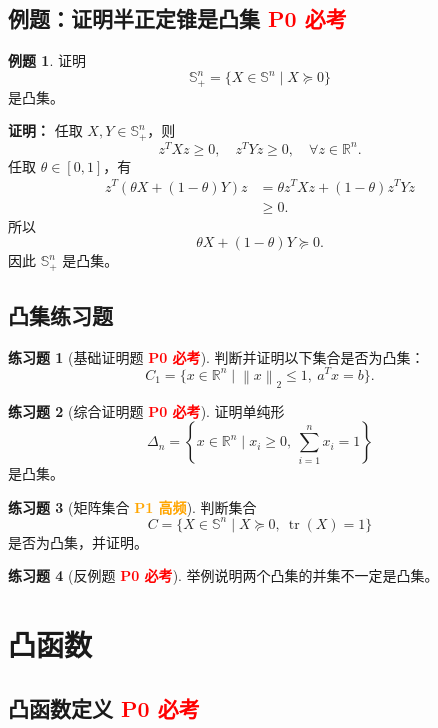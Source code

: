 \documentclass[11pt,a4paper]{ctexart}
\newcommand{\R}{\mathbb{R}}
\newcommand{\Ssym}{\mathbb{S}}
\newcommand{\Snplus}{\mathbb{S}_+^n}
\newcommand{\tr}{\operatorname{tr}}
\newcommand{\norm}[1]{\left\lVert #1 \right\rVert}
\newcommand{\Pzero}{\textcolor{red}{\textbf{P0 必考}}}
\newcommand{\Pone}{\textcolor{orange}{\textbf{P1 高频}}}
\theoremstyle{definition}
\newtheorem{example}{例题}[section]
\newtheorem{exercise}{练习题}[section]
\theoremstyle{plain}
\theoremstyle{remark}
\begin{document}
\subsection{例题：证明半正定锥是凸集 \Pzero}

\begin{example}
证明
\[
    \Snplus=\{X\in\Ssym^n\mid X\succeq0\}
\]
是凸集。

\textbf{证明：}
任取 $X,Y\in\Snplus$，则
\[
    z^TXz\ge0,\quad z^TYz\ge0,\quad \forall z\in\R^n.
\]
任取 $\theta\in[0,1]$，有
\[
\begin{aligned}
    z^T\left(\theta X+(1-\theta)Y\right)z
    &=
    \theta z^TXz+(1-\theta)z^TYz\\
    &\ge0.
\end{aligned}
\]
所以
\[
    \theta X+(1-\theta)Y\succeq0.
\]
因此 $\Snplus$ 是凸集。
\end{example}

\subsection{凸集练习题}

\begin{exercise}[基础证明题 \Pzero]
判断并证明以下集合是否为凸集：
\[
    C_1=\{x\in\R^n\mid \norm{x}_2\le1,\ a^Tx=b\}.
\]
\end{exercise}

\begin{exercise}[综合证明题 \Pzero]
证明单纯形
\[
    \Delta_n=\left\{x\in\R^n\mid x_i\ge0,\ \sum_{i=1}^n x_i=1\right\}
\]
是凸集。
\end{exercise}

\begin{exercise}[矩阵集合 \Pone]
判断集合
\[
    C=\{X\in\Ssym^n\mid X\succeq0,\ \tr(X)=1\}
\]
是否为凸集，并证明。
\end{exercise}

\begin{exercise}[反例题 \Pzero]
举例说明两个凸集的并集不一定是凸集。
\end{exercise}

\newpage

\section{凸函数}

\subsection{凸函数定义 \Pzero}
\end{document}
